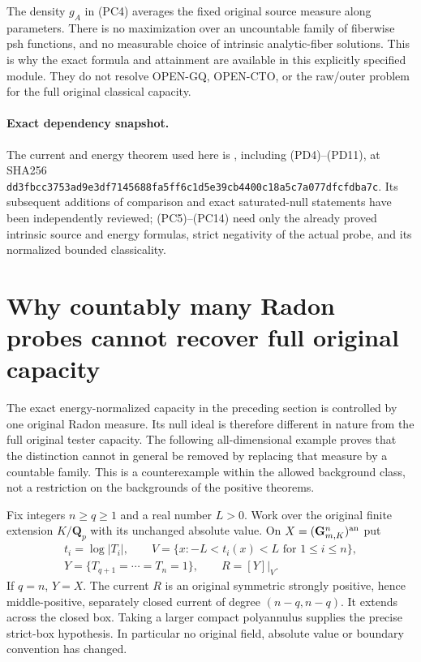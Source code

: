 \documentclass[11pt,a4paper]{article}
\numberwithin{equation}{section}
\theoremstyle{definition}
\theoremstyle{remark}
\begin{document}
The density $g_A$ in (PC4) averages the fixed original source
measure along parameters. There is no maximization over an
uncountable family of fiberwise psh functions, and no measurable
choice of intrinsic analytic-fiber solutions. This is why the
exact formula and attainment are available in this explicitly
specified module. They do not resolve OPEN-GQ, OPEN-CTO, or
the raw/outer problem for the full original classical capacity.

\paragraph{Exact dependency snapshot.}
The current and energy theorem used here is
, including
(PD4)--(PD11), at SHA256
{\small\nolinkurl{dd3fbcc3753ad9e3df7145688fa5ff6c1d5e39cb4400c18a5c7a077dfcfdba7c}}.
Its subsequent additions of comparison and exact saturated-null
statements have been independently reviewed; (PC5)--(PC14) need
only the already proved intrinsic source and energy formulas,
strict negativity of the actual probe, and its normalized bounded
classicality.



\section{Why countably many Radon probes cannot recover full original capacity}
\label{sec:r12-countable-measure-capacity-obstruction}

The exact energy-normalized capacity in the preceding section is
controlled by one original Radon measure. Its null ideal is therefore
different in nature from the full original tester capacity. The
following all-dimensional example proves that the distinction cannot
in general be removed by replacing that measure by a countable family.
This is a counterexample within the allowed background class, not a
restriction on the backgrounds of the positive theorems.

Fix integers $n\geq q\geq1$ and a real number $L>0$. Work over the
original finite extension $K/\mathbf Q_p$ with its unchanged absolute
value. On $X=(\mathbf G_{m,K}^n)^{\rm an}$ put
\[
 \begin{gathered}
 t_i=\log|T_i|,\qquad
 V=\{x:-L<t_i(x)<L\text{ for }1\leq i\leq n\},\\
 Y=\{T_{q+1}=\cdots=T_n=1\},\qquad R=[Y]|_V.
 \end{gathered}
 \tag{CM1}
\]
If $q=n$, $Y=X$. The current $R$ is an original symmetric strongly
positive, hence middle-positive, separately closed current of degree
$(n-q,n-q)$. It extends across the closed box. Taking a larger compact
polyannulus supplies the precise strict-box hypothesis. In particular
no original field, absolute value or boundary convention has changed.
\end{document}

